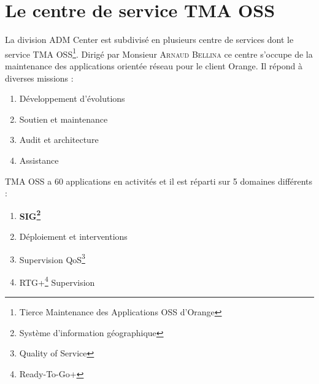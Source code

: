 \section{Le centre de service TMA OSS}

La division ADM Center est subdivisé en plusieurs centre de services dont le service TMA OSS\footnote{Tierce Maintenance des Applications OSS d’Orange}.
Dirigé par Monsieur \textsc{Arnaud Bellina} ce centre s'occupe de la maintenance des applications orientée réseau pour le client Orange.
Il répond à diverses missions :

\begin{enumerate}
\item Développement d'évolutions
\item Soutien et maintenance
\item Audit et architecture
\item Assistance\\
\end{enumerate}

TMA OSS a 60 applications en activités et il est réparti sur 5 domaines différents :

\begin{enumerate}
\item \textbf{SIG\footnote{Système d’information géographique }}
\item Déploiement et interventions
\item Supervision QoS\footnote{Quality of Service}
\item RTG+\footnote{Ready-To-Go+} Supervision\\
\end{enumerate}

